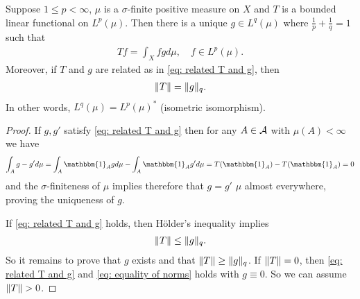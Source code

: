 \begin{theorem}\label{thm: p dual of q}
Suppose $1\le p < \infty$, $\mu$ is a $\sigma$-finite positive measure on $X$ and $T$ is a bounded linear functional on $L^{p}(\mu)$. Then there is a unique $g\in L^{q}(\mu)$ where $\frac{1}{p}+\frac{1}{q}=1$ such that
\begin{align}
	Tf=\int_{X}fgd\mu, \quad f\in L^{p}(\mu). \label{eq: related T and g}
\end{align}
Moreover, if $T$ and $g$ are related as in \eqref{eq: related T and g}, then
\begin{align}
	\Vert{T}\Vert=\Vert{g}\Vert_{q}. \label{eq: equality of norms}
\end{align}
In other words, $L^{q}(\mu)=L^{p}(\mu)^{*}$ (isometric isomorphism).
\end{theorem}
\begin{proof}
If $g,g'$ satisfy \eqref{eq: related T and g} then for any $A\in \mathcal{A}$ with $\mu(A)<\infty$ we have 
\begin{align*}
	\int_{A}g-g'd\mu=\int_{A}\mathbbm{1}_{A}gd\mu-\int_{A}\mathbbm{1}_{A}g'd\mu=T(\mathbbm{1}_{A})-T(\mathbbm{1}_{A})=0
\end{align*}
and the $\sigma$-finiteness of $\mu$ implies therefore that $g=g'$ $\mu$ almost everywhere, proving the uniqueness of $g$.

If \eqref{eq: related T and g} holds, then Hölder's inequality implies
\begin{align*}
	\Vert{T}\Vert\le \Vert{g}\Vert_{q}.
\end{align*}
So it remains to prove that $g$ exists and that $\Vert{T}\Vert\ge \Vert{g}\Vert_{q}$. If $\Vert{T}\Vert=0$, then \eqref{eq: related T and g} and \eqref{eq: equality of norms} holds with $g\equiv 0$. So we can assume $\Vert{T}\Vert>0$.


\end{proof}
